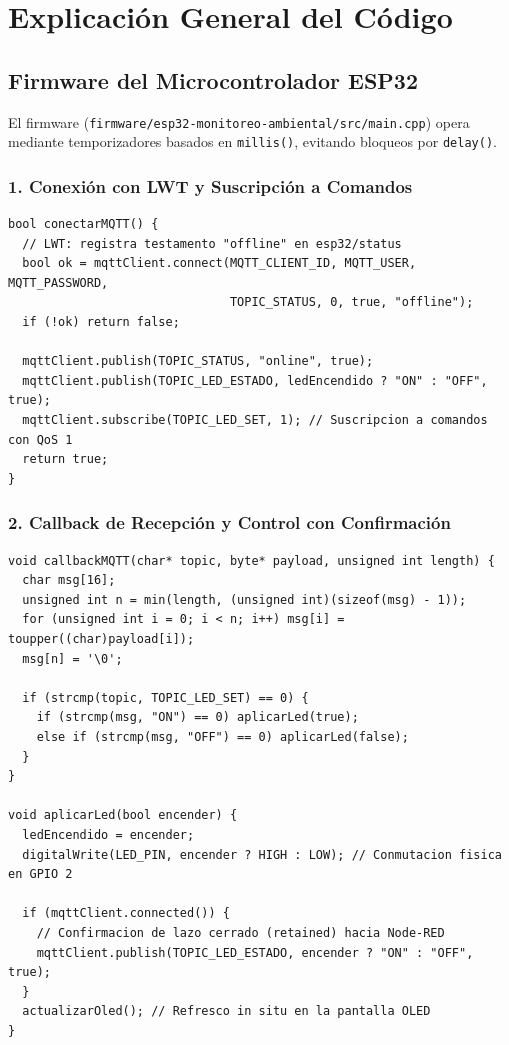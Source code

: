 \section{Explicación General del Código}

\subsection{Firmware del Microcontrolador ESP32}
El firmware (\texttt{firmware/esp32-monitoreo-ambiental/src/main.cpp}) opera mediante temporizadores basados en \texttt{millis()}, evitando bloqueos por \texttt{delay()}.

\subsubsection{1. Conexión con LWT y Suscripción a Comandos}
\begin{lstlisting}[style=customcpp]
bool conectarMQTT() {
  // LWT: registra testamento "offline" en esp32/status
  bool ok = mqttClient.connect(MQTT_CLIENT_ID, MQTT_USER, MQTT_PASSWORD,
                               TOPIC_STATUS, 0, true, "offline");
  if (!ok) return false;

  mqttClient.publish(TOPIC_STATUS, "online", true);
  mqttClient.publish(TOPIC_LED_ESTADO, ledEncendido ? "ON" : "OFF", true);
  mqttClient.subscribe(TOPIC_LED_SET, 1); // Suscripcion a comandos con QoS 1
  return true;
}
\end{lstlisting}

\subsubsection{2. Callback de Recepción y Control con Confirmación}
\begin{lstlisting}[style=customcpp]
void callbackMQTT(char* topic, byte* payload, unsigned int length) {
  char msg[16];
  unsigned int n = min(length, (unsigned int)(sizeof(msg) - 1));
  for (unsigned int i = 0; i < n; i++) msg[i] = toupper((char)payload[i]);
  msg[n] = '\0';

  if (strcmp(topic, TOPIC_LED_SET) == 0) {
    if (strcmp(msg, "ON") == 0) aplicarLed(true);
    else if (strcmp(msg, "OFF") == 0) aplicarLed(false);
  }
}

void aplicarLed(bool encender) {
  ledEncendido = encender;
  digitalWrite(LED_PIN, encender ? HIGH : LOW); // Conmutacion fisica en GPIO 2

  if (mqttClient.connected()) {
    // Confirmacion de lazo cerrado (retained) hacia Node-RED
    mqttClient.publish(TOPIC_LED_ESTADO, encender ? "ON" : "OFF", true);
  }
  actualizarOled(); // Refresco in situ en la pantalla OLED
}
\end{lstlisting}


